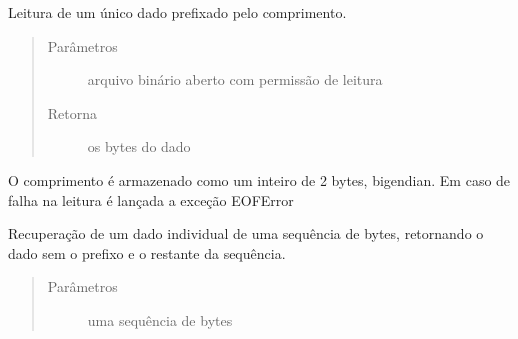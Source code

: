 \documentclass[letterpaper,10pt,brazil]{sphinxmanual}
\begin{document}
\begin{fulllineitems}
\begin{fulllineitems}
\label{\detokenize{estrutarq.dado:estrutarq.dado.DadoPrefixado.leia_de_arquivo}}
\pysigstartsignatures
{}
\pysigstopsignatures
\sphinxAtStartPar
Leitura de um único dado prefixado pelo comprimento.
\begin{quote}\begin{description}
\item[{Parâmetros}] \leavevmode
\sphinxAtStartPar
{} \textendash{} arquivo binário aberto com permissão de leitura

\item[{Retorna}] \leavevmode
\sphinxAtStartPar
os bytes do dado

\end{description}\end{quote}

\sphinxAtStartPar
O comprimento é armazenado como um inteiro de 2 bytes, big\sphinxhyphen{}endian.
Em caso de falha na leitura é lançada a exceção EOFError

\end{fulllineitems}


\begin{fulllineitems}
\label{\detokenize{estrutarq.dado:estrutarq.dado.DadoPrefixado.leia_de_bytes}}
\pysigstartsignatures
{}
\pysigstopsignatures
\sphinxAtStartPar
Recuperação de um dado individual de uma sequência de bytes,
retornando o dado sem o prefixo e o restante da sequência.
\begin{quote}\begin{description}
\item[{Parâmetros}] \leavevmode
\sphinxAtStartPar
{} \textendash{} uma sequência de bytes


\end{description}
\end{quote}
\end{fulllineitems}
\end{fulllineitems}
\end{document}
